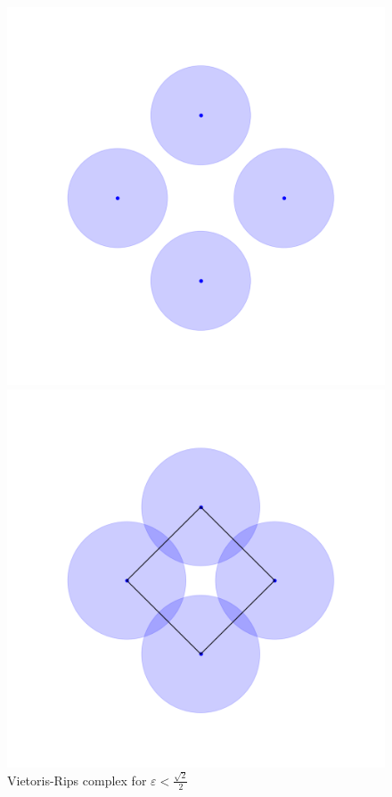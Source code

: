 \begin{example}
\begin{figure}[!htb]
  \includegraphics[width=\linewidth]{imgs/vr_example_1_0_6.png}
  \caption*{
  Vietoris-Rips complex for $\varepsilon<\frac{\sqrt{2}}{2}$
  }
  \label{fig:awesome_image1}
\endminipage\hfill
{}
  \includegraphics[width=\linewidth]{imgs/vr_example_1_0_8.png}

\end{figure}
\end{example}
